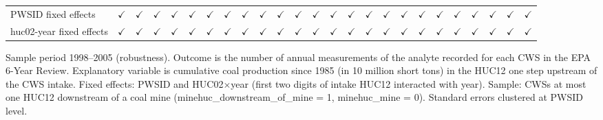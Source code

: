 \begin{table}[htbp]
\begin{adjustbox}{width = \textwidth, center}
\begin{tabular}{lcccccccccccccccccccccccc}
         PWSID fixed effects                 & $\checkmark$          & $\checkmark$          & $\checkmark$          & $\checkmark$          & $\checkmark$       & $\checkmark$      & $\checkmark$          & $\checkmark$       & $\checkmark$      & $\checkmark$          & $\checkmark$       & $\checkmark$      & $\checkmark$          & $\checkmark$       & $\checkmark$      & $\checkmark$          & $\checkmark$          & $\checkmark$      & $\checkmark$          & $\checkmark$       & $\checkmark$      & $\checkmark$          & $\checkmark$          & $\checkmark$\\   
         huc02-year fixed effects            & $\checkmark$          & $\checkmark$          & $\checkmark$          & $\checkmark$          & $\checkmark$       & $\checkmark$      & $\checkmark$          & $\checkmark$       & $\checkmark$      & $\checkmark$          & $\checkmark$       & $\checkmark$      & $\checkmark$          & $\checkmark$       & $\checkmark$      & $\checkmark$          & $\checkmark$          & $\checkmark$      & $\checkmark$          & $\checkmark$       & $\checkmark$      & $\checkmark$          & $\checkmark$          & $\checkmark$\\   
         
         \bottomrule
         
      \end{tabular}
      
      
      
   \end{adjustbox}
      {\tiny\linespread{1}\selectfont \par \raggedright 
   Sample period 1998--2005 (robustness). Outcome is the number of annual measurements of the analyte recorded for each CWS in the EPA 6-Year Review. Explanatory variable is cumulative coal production since 1985 (in 10 million short tons) in the HUC12 one step upstream of the CWS intake. Fixed effects: PWSID and HUC02$\times$year (first two digits of intake HUC12 interacted with year). Sample: CWSs at most one HUC12 downstream of a coal mine (minehuc\_downstream\_of\_mine = 1, minehuc\_mine = 0). Standard errors clustered at PWSID level.}
   
\end{table}


